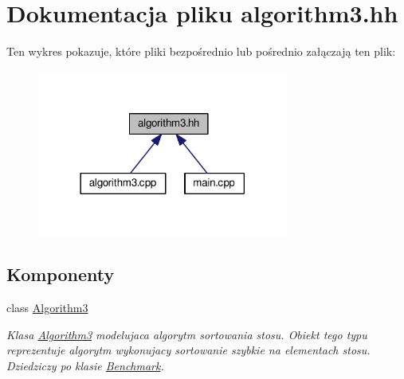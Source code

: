 \hypertarget{algorithm3_8hh}{\section{Dokumentacja pliku algorithm3.\-hh}
\label{algorithm3_8hh}
}
Ten wykres pokazuje, które pliki bezpośrednio lub pośrednio załączają ten plik\-:
\nopagebreak
\begin{figure}[H]
\begin{center}
\leavevmode
\includegraphics[width=234pt]{algorithm3_8hh__dep__incl}
\end{center}
\end{figure}
\subsection*{Komponenty}
\begin{DoxyCompactItemize}
\item 
class \hyperlink{class_algorithm3}{Algorithm3}
\begin{DoxyCompactList}\small\item\em Klasa \hyperlink{class_algorithm3}{Algorithm3} modelujaca algorytm sortowania stosu. Obiekt tego typu reprezentuje algorytm wykonujacy sortowanie szybkie na elementach stosu. Dziedziczy po klasie \hyperlink{class_benchmark}{Benchmark}. \end{DoxyCompactList}\end{DoxyCompactItemize}
